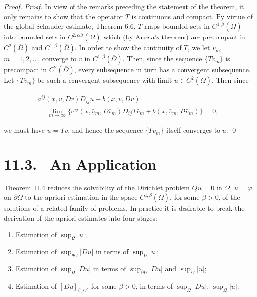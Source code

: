 \begin{proof}
\textit{Proof.} In view of the remarks preceding the statement of the theorem, it only remains to show that the operator $T$ is continuous and compact. By virtue of the global Schauder estimate, Theorem 6.6, $T$ maps bounded sets in $C^{1,\beta}(\overline{\Omega})$ into bounded sets in $C^{2,\alpha\beta}(\overline{\Omega})$ which (by Arzela's theorem) are precompact in $C^2(\overline{\Omega})$ and $C^{1,\beta}(\overline{\Omega})$. In order to show the continuity of $T$, we let $v_m$, $m=1,2,\ldots$, converge to $v$ in $C^{1,\beta}(\overline{\Omega})$. Then, since the sequence $\{Tv_m\}$ is precompact in $C^2(\overline{\Omega})$, every subsequence in turn has a convergent subsequence. Let $\{Tv_m\}$ be such a convergent subsequence with limit $u\in C^2(\overline{\Omega})$. Then since

\begin{gather*}
a^{ij}(x,v,Dv)D_{ij}u+b(x,v,Dv) \\
= \lim_{m\to\infty}\{a^{ij}(x,\bar v_m,D\bar v_m)D_{ij}T\bar v_m+b(x,\bar v_m,D\bar v_m)\}=0,
\end{gather*}

\noindent we must have $u=Tv$, and hence the sequence $\{Tv_m\}$ itself converges to $u$. \qed
\end{proof}

\section*{11.3. \ An Application}

Theorem 11.4 reduces the solvability of the Dirichlet problem $Qu=0$ in $\Omega$, $u=\varphi$ on $\partial\Omega$ to the apriori estimation in the space $C^{1,\beta}(\overline{\Omega})$, for some $\beta>0$, of the solutions of a related family of problems. In practice it is desirable to break the derivation of the apriori estimates into four stages:

\begin{enumerate}
\item Estimation of $\sup_\Omega |u|$;
\item Estimation of $\sup_{\partial\Omega} |Du|$ in terms of $\sup_\Omega |u|$;
\item Estimation of $\sup_\Omega |Du|$ in terms of $\sup_{\partial\Omega} |Du|$ and $\sup_\Omega |u|$;
\item Estimation of $[Du]_{\beta;\Omega}$, for some $\beta>0$, in terms of $\sup_\Omega |Du|$, $\sup_\Omega |u|$.
\end{enumerate}

